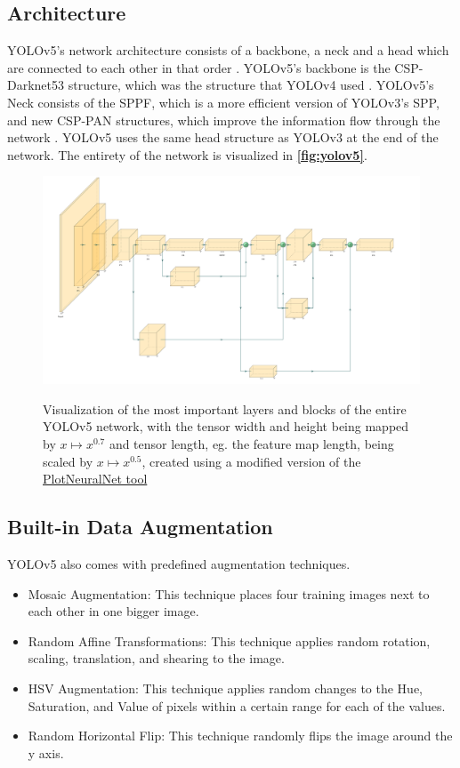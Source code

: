 \documentclass[10pt]{book}
\newcommand{\figureref}[1]{\textbf{\autoref{#1}}}
\begin{document}
\subsection{Architecture}

\ac{YOLO}v5's network architecture consists of a backbone, a neck and a head which are connected to each other in that order \cite{jani2023model}. \ac{YOLO}v5's backbone is the CSP-Darknet53 structure, which was the structure that \ac{YOLO}v4 used \cite{bochkovskiy2020yolov4}. \ac{YOLO}v5's Neck consists of the \ac{SPPF}, which is a more efficient version of \ac{YOLO}v3's \ac{SPP}, and new \ac{CSP-PAN} structures, which improve the information flow through the network \cite{liu2018path}. \ac{YOLO}v5 uses the same head structure as \ac{YOLO}v3 at the end of the network. The entirety of the network is visualized in \figureref{fig:yolov5}.

\begin{figure}
  \caption{Visualization of the most important layers and blocks of the entire \ac{YOLO}v5 network, with the tensor width and height being mapped by $x \mapsto x^{0.7}$ and tensor length, eg. the feature map length, being scaled by $x \mapsto x^{0.5}$, created using a modified version of the \href{https://github.com/jnccd/PlotNeuralNet}{PlotNeuralNet tool} \cite{haris_iqbal_2018_2526396}}
  \includegraphics[width=\textwidth]{image/yolov5}
  \label{fig:yolov5}
\end{figure}

\subsection{Built-in Data Augmentation}

\ac{YOLO}v5 also comes with predefined augmentation techniques. 

\begin{itemize}
  \item Mosaic Augmentation: This technique places four training images next to each other in one bigger image.
  \item Random Affine Transformations: This technique applies random rotation, scaling, translation, and shearing to the image.
  \item HSV Augmentation: This technique applies random changes to the Hue, Saturation, and Value of pixels within a certain range for each of the values.
  \item Random Horizontal Flip: This technique randomly flips the image around the y axis.
\end{itemize}
\end{document}
